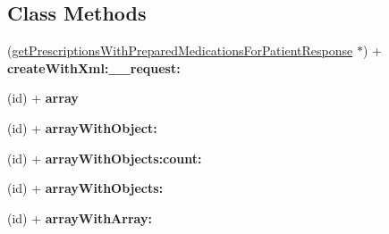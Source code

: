 \subsection*{Class Methods}
\begin{DoxyCompactItemize}
\item 
\hypertarget{interfaceget_prescriptions_with_prepared_medications_for_patient_response_a7c46fa7d321e6ae37395f637c8449c0e}{}(\hyperlink{interfaceget_prescriptions_with_prepared_medications_for_patient_response}{get\+Prescriptions\+With\+Prepared\+Medications\+For\+Patient\+Response} $\ast$) + {\bfseries create\+With\+Xml\+:\+\_\+\+\_\+request\+:}\label{interfaceget_prescriptions_with_prepared_medications_for_patient_response_a7c46fa7d321e6ae37395f637c8449c0e}

\item 
\hypertarget{interfaceget_prescriptions_with_prepared_medications_for_patient_response_a58ace3c7fa1e89aa58ad6691113b0316}{}(id) + {\bfseries array}\label{interfaceget_prescriptions_with_prepared_medications_for_patient_response_a58ace3c7fa1e89aa58ad6691113b0316}

\item 
\hypertarget{interfaceget_prescriptions_with_prepared_medications_for_patient_response_a6de14b2e98d4e4e86371401a4d210c2e}{}(id) + {\bfseries array\+With\+Object\+:}\label{interfaceget_prescriptions_with_prepared_medications_for_patient_response_a6de14b2e98d4e4e86371401a4d210c2e}

\item 
\hypertarget{interfaceget_prescriptions_with_prepared_medications_for_patient_response_a8553d685b4f4dd21c9bff8fdb1f28341}{}(id) + {\bfseries array\+With\+Objects\+:count\+:}\label{interfaceget_prescriptions_with_prepared_medications_for_patient_response_a8553d685b4f4dd21c9bff8fdb1f28341}

\item 
\hypertarget{interfaceget_prescriptions_with_prepared_medications_for_patient_response_ad386301a1c3065fde7d6d7cc6439c4d7}{}(id) + {\bfseries array\+With\+Objects\+:}\label{interfaceget_prescriptions_with_prepared_medications_for_patient_response_ad386301a1c3065fde7d6d7cc6439c4d7}

\item 
\hypertarget{interfaceget_prescriptions_with_prepared_medications_for_patient_response_a18de6c174539b1f1d6dc7adf6b246b84}{}(id) + {\bfseries array\+With\+Array\+:}\label{interfaceget_prescriptions_with_prepared_medications_for_patient_response_a18de6c174539b1f1d6dc7adf6b246b84}


\end{DoxyCompactItemize}
